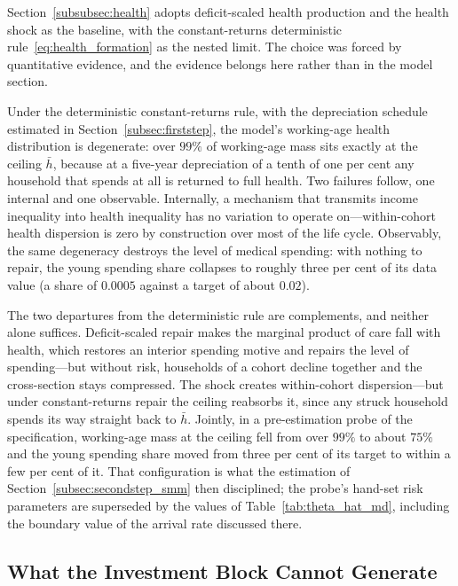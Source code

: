 \documentclass[12pt,a4paper]{article}
\begin{document}
Section~\ref{subsubsec:health} adopts deficit-scaled health production and the health shock as the baseline, with the constant-returns deterministic rule~\eqref{eq:health_formation} as the nested limit. The choice was forced by quantitative evidence, and the evidence belongs here rather than in the model section.

Under the deterministic constant-returns rule, with the depreciation schedule estimated in Section~\ref{subsec:firststep}, the model's working-age health distribution is degenerate: over $99\%$ of working-age mass sits exactly at the ceiling $\bar h$, because at a five-year depreciation of a tenth of one per cent any household that spends at all is returned to full health. Two failures follow, one internal and one observable. Internally, a mechanism that transmits income inequality into health inequality has no variation to operate on---within-cohort health dispersion is zero by construction over most of the life cycle. Observably, the same degeneracy destroys the level of medical spending: with nothing to repair, the young spending share collapses to roughly three per cent of its data value (a share of $0.0005$ against a target of about $0.02$).

The two departures from the deterministic rule are complements, and neither alone suffices. Deficit-scaled repair makes the marginal product of care fall with health, which restores an interior spending motive and repairs the level of spending---but without risk, households of a cohort decline together and the cross-section stays compressed. The shock creates within-cohort dispersion---but under constant-returns repair the ceiling reabsorbs it, since any struck household spends its way straight back to $\bar h$. Jointly, in a pre-estimation probe of the specification, working-age mass at the ceiling fell from over $99\%$ to about $75\%$ and the young spending share moved from three per cent of its target to within a few per cent of it. That configuration is what the estimation of Section~\ref{subsec:secondstep_smm} then disciplined; the probe's hand-set risk parameters are superseded by the values of Table~\ref{tab:theta_hat_md}, including the boundary value of the arrival rate discussed there.

\subsection{What the Investment Block Cannot Generate}
\label{subsec:capacity_result}
\end{document}

